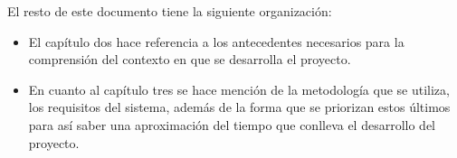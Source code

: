 El resto de este documento tiene la siguiente organización:

\begin{itemize}
    \item El capítulo dos hace referencia a los antecedentes necesarios para la comprensión del contexto en que se desarrolla el proyecto.
    \item En cuanto al capítulo tres se hace mención de la metodología que se utiliza, los requisitos del sistema, además de la forma que se priorizan estos últimos para así saber una aproximación del tiempo que conlleva el desarrollo del proyecto.
\end{itemize}

